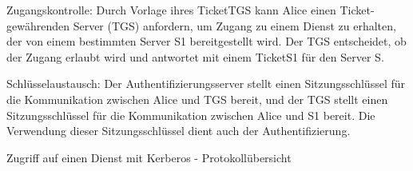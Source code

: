 \documentclass[a4paper]{article}
\begin{document}
\begin{multicols}{3}
\begin{itemize*}
\begin{itemize*}
                  \item Zugangskontrolle: Durch Vorlage ihres TicketTGS kann Alice einen Ticket-gewährenden Server (TGS) anfordern, um Zugang zu einem Dienst zu erhalten, der von einem bestimmten Server S1 bereitgestellt wird. Der TGS entscheidet, ob der Zugang erlaubt wird und antwortet mit einem TicketS1 für den Server S.
                  \item Schlüsselaustausch: Der Authentifizierungsserver stellt einen Sitzungsschlüssel für die Kommunikation zwischen Alice und TGS bereit, und der TGS stellt einen Sitzungsschlüssel für die Kommunikation zwischen Alice und S1 bereit. Die Verwendung dieser Sitzungsschlüssel dient auch der Authentifizierung.
            \end{itemize*}
      \end{itemize*}

      Zugriff auf einen Dienst mit Kerberos - Protokollübersicht


\end{multicols}
\end{document}
